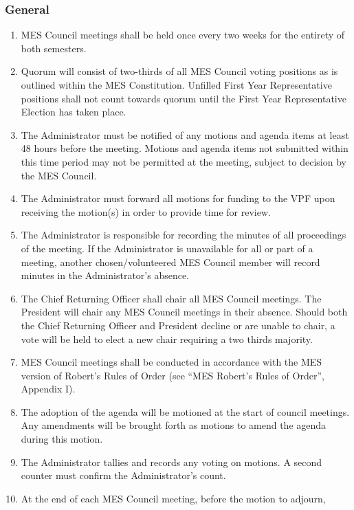 \hypertarget{general-1}{%
 \subsubsection{General}
 \label{general-1}}

\begin{enumerate}
 \item
  MES Council meetings shall be held once every two weeks for the
  entirety of both semesters.
 \item
  Quorum will consist of two-thirds of all MES Council voting positions
  as is outlined within the MES Constitution. Unfilled First Year
  Representative positions shall not count towards quorum until the
  First Year Representative Election has taken place.
 \item
  The Administrator must be notified of any motions and agenda items at
  least 48 hours before the meeting. Motions and agenda items not
  submitted within this time period may not be permitted at the meeting,
  subject to decision by the MES Council.
 \item
  The Administrator must forward all motions for funding to the VPF upon
  receiving the motion(s) in order to provide time for review.
 \item
  The Administrator is responsible for recording the minutes of all
  proceedings of the meeting. If the Administrator is unavailable for
  all or part of a meeting, another chosen/volunteered MES Council
  member will record minutes in the Administrator's absence.
 \item
  The Chief Returning Officer shall chair all MES Council meetings. The
  President will chair any MES Council meetings in their absence. Should
  both the Chief Returning Officer and President decline or are unable
  to chair, a vote will be held to elect a new chair requiring a two
  thirds majority.
 \item
  MES Council meetings shall be conducted in accordance with the MES
  version of Robert's Rules of Order (see ``MES Robert's Rules of
  Order'', Appendix I).
 \item
  The adoption of the agenda will be motioned at the start of council
  meetings. Any amendments will be brought forth as motions to amend the
  agenda during this motion.
 \item
  The Administrator tallies and records any voting on motions. A second
  counter must confirm the Administrator's count.
 \item
  At the end of each MES Council meeting, before the motion to adjourn,

\end{enumerate}
